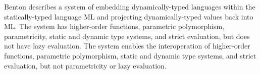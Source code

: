 Benton \cite{benton05} describes a system of embedding dynamically-typed languages within the statically-typed language ML and projecting dynamically-typed values back into ML.  The system has higher-order functions, parametric polymorphism, parametricity, static and dynamic type systems, and strict evaluation, but does not have lazy evaluation.  The system enables the interoperation of higher-order functions, parametric polymorphism, static and dynamic type systems, and strict evaluation, but not parametricity or lazy evaluation.